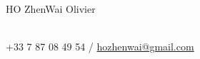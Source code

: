 \documentclass[10pt]{article} %
\begin{document}
%		
\begin{center}
\begin{large} HO ZhenWai Olivier \end{large}
\\
+33 7 87 08 49 54 / \href{mailto:hozhenwai@gmail.com}{hozhenwai@gmail.com}%
\end{center}
%
%
%
\end{document}
